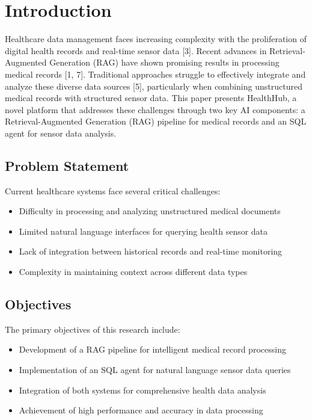 \section{Introduction}

Healthcare data management faces increasing complexity with the proliferation of digital health records and real-time sensor data [3]. Recent advances in Retrieval-Augmented Generation (RAG) have shown promising results in processing medical records [1, 7]. Traditional approaches struggle to effectively integrate and analyze these diverse data sources [5], particularly when combining unstructured medical records with structured sensor data. This paper presents HealthHub, a novel platform that addresses these challenges through two key AI components: a Retrieval-Augmented Generation (RAG) pipeline for medical records and an SQL agent for sensor data analysis.

\subsection{Problem Statement}
Current healthcare systems face several critical challenges:
\begin{itemize}
\item Difficulty in processing and analyzing unstructured medical documents
\item Limited natural language interfaces for querying health sensor data
\item Lack of integration between historical records and real-time monitoring
\item Complexity in maintaining context across different data types
\end{itemize}

\subsection{Objectives}
The primary objectives of this research include:
\begin{itemize}
\item Development of a RAG pipeline for intelligent medical record processing
\item Implementation of an SQL agent for natural language sensor data queries
\item Integration of both systems for comprehensive health data analysis
\item Achievement of high performance and accuracy in data processing
\end{itemize}

